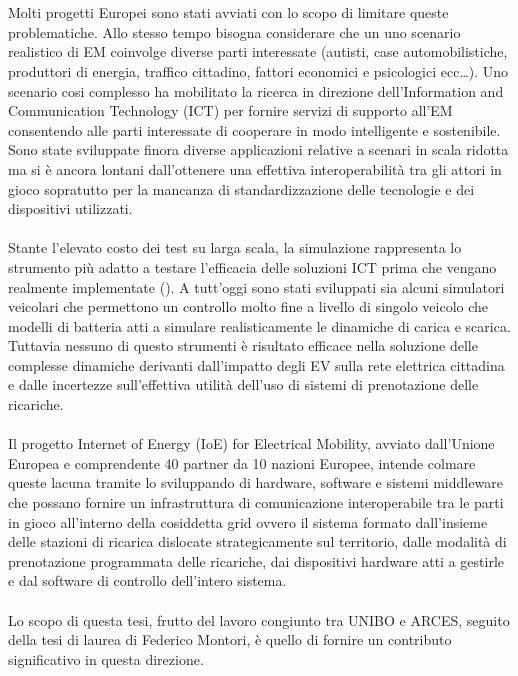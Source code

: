 \\\\
Molti progetti Europei sono stati avviati con lo scopo di limitare queste problematiche. Allo stesso tempo bisogna considerare che un uno scenario realistico di EM coinvolge diverse parti interessate (autisti, case automobilistiche, produttori di energia, traffico cittadino, fattori economici e psicologici ecc\dots). Uno scenario cosi complesso ha mobilitato la ricerca in direzione dell'Information and Communication Technology (ICT) per fornire servizi di supporto all'EM consentendo alle parti interessate di cooperare in modo intelligente e sostenibile.
Sono state sviluppate finora diverse applicazioni relative a scenari in scala ridotta ma si è ancora lontani dall'ottenere una effettiva interoperabilità tra gli attori in gioco sopratutto per la mancanza di standardizzazione delle tecnologie e dei dispositivi utilizzati.
\\\\
Stante l'elevato costo dei test su larga scala, la simulazione rappresenta lo strumento più adatto a testare l'efficacia delle soluzioni ICT prima che vengano realmente implementate (\cite{felice2012group}). A tutt'oggi sono stati sviluppati sia alcuni simulatori veicolari che permettono un controllo molto fine a livello di singolo veicolo che modelli di batteria atti a simulare realisticamente le dinamiche di carica e scarica. Tuttavia nessuno di questo strumenti è risultato efficace nella soluzione delle complesse dinamiche derivanti dall'impatto degli EV sulla rete elettrica cittadina e dalle incertezze sull'effettiva utilità dell'uso di sistemi di prenotazione delle ricariche. 
\\\\
Il progetto Internet of Energy (IoE) for Electrical Mobility, avviato dall'Unione Europea e comprendente 40 partner da 10 nazioni Europee, intende colmare queste lacuna tramite lo sviluppando di hardware, software e sistemi middleware che possano fornire un infrastruttura di comunicazione interoperabile tra le parti in gioco all'interno della cosiddetta grid ovvero il sistema formato dall'insieme delle stazioni di ricarica dislocate strategicamente sul territorio, dalle modalità di prenotazione programmata delle ricariche, dai dispositivi hardware atti a gestirle e dal software di controllo dell'intero sistema.
\\\\
Lo scopo di questa tesi, frutto del lavoro congiunto tra UNIBO e ARCES, seguito della tesi di laurea di Federico Montori, è quello di fornire un contributo significativo in questa direzione.

